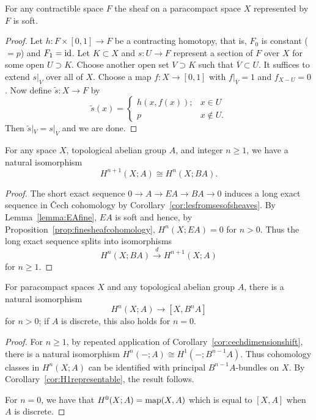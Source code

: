 \documentclass[a4paper,openany]{scrbook}
\begin{document}
\begin{lemma}\label{lemma:EAfine}
For any contractible space $F$ the sheaf on a paracompact space $X$ represented by $F$ is soft.
\end{lemma}
\begin{proof}
Let $h\colon F \times [0,1] \to F$ be a contracting homotopy, that is, $F_0$ is constant ($=p$) and $F_1=\operatorname{id}$. Let $K \subset X$ and $s\colon U \to F$ represent a section of $F$ over $X$ for some open $U \supset K$. Choose another open set $V \supset K$ such that $\overline V \subset U$. It suffices to extend $s|_V$ over all of $X$. Choose a map $f\colon X \to [0,1]$ with $f|_{\overline V} = 1$ and $f_{X-U}=0$. Now define $\tilde s\colon X \to F$ by
\[
\tilde s(x) = \begin{cases} h(x,f(x)); & x \in U\\
p\; & x \not\in U.\end{cases}
\]
Then $\tilde s|_V = s|_V$ and we are done.
\end{proof}

\begin{corollary} \label{cor:cechdimensionshift}
For any space $X$, topological abelian group $A$, and integer $n\geq 1$, we have a natural isomorphism
\[
H^{n+1}(X;A) \cong H^n(X;BA).
\]
\end{corollary}
\begin{proof}
The short exact sequence $0 \to A \to EA \to BA \to 0$ induces a long exact sequence in \v Cech cohomology by Corollary~\ref{cor:lesfromsesofsheaves}. By Lemma~\ref{lemma:EAfine}, $EA$ is soft and hence, by Proposition~\ref{prop:finesheafcohomology}, $H^n(X;EA)=0$ for $n>0$. Thus the long exact sequence splits into isomorphisms
\[
H^n(X;BA) \xrightarrow{d} H^{n+1}(X;A)
\]
for $n \geq 1$.
\end{proof}

\begin{corollary}\label{cor:cohomologyrepresentable}
For paracompact spaces $X$ and any topological abelian group $A$, there is a natural isomorphism
\[
H^n(X;A) \to [X,B^nA]
\]
for $n>0$; if $A$ is discrete, this also holds for $n=0$.
\end{corollary}
\begin{proof}
For $n\geq 1$, by repeated application of Corollary~\ref{cor:cechdimensionshift}, there is a natural isomorphism $H^n(-;A) \cong H^1(-;B^{n-1}A)$. Thus cohomology classes in $H^n(X;A)$ can be identified with principal $B^{n-1}A$-bundles on $X$. By Corollary~\ref{cor:H1representable}, the result follows.

For $n=0$, we have that $H^0(X;A) = \operatorname{map}(X,A)$ which is equal to $[X,A]$ when $A$ is discrete.
\end{proof}
\end{document}
